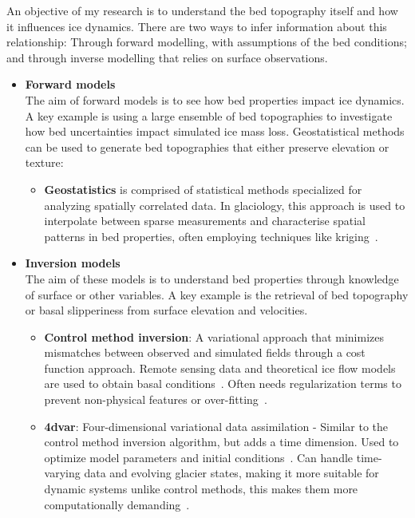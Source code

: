 An objective of my research is to understand the bed topography itself and how it influences ice dynamics. There are two ways to infer information about this relationship: Through forward modelling, with assumptions of the bed conditions; and through inverse modelling that relies on surface observations.
\begin{itemize}
    \item\textbf{Forward models}\\
    The aim of forward models is to see how bed properties impact ice dynamics. A key example is using a large ensemble of bed topographies to investigate how bed uncertainties impact simulated ice mass loss. Geostatistical methods can be used to generate bed topographies that either preserve elevation or texture:    
    \begin{itemize}
            \item\textbf{Geostatistics} is comprised of statistical methods specialized for analyzing spatially correlated data. In glaciology, this approach is used to interpolate between sparse measurements and characterise spatial patterns in bed properties, often employing techniques like kriging~\cite{Mackie_2020}.

    \end{itemize}

    \item\textbf{Inversion models}\\
    The aim of these models is to understand bed properties through knowledge of surface or other variables. A key example is the retrieval of bed topography or basal slipperiness from surface elevation and velocities.

        \begin{itemize}
            \item\textbf{Control method inversion}: A variational approach that minimizes mismatches between observed and simulated fields through a cost function approach. Remote sensing data and theoretical ice flow models are used to obtain basal conditions~\cite{deRydt_2013}. Often needs regularization terms to prevent non-physical features or over-fitting~\cite{Morlighem_Goldberg_2024}.

            \item\textbf{4dvar}: Four-dimensional variational data assimilation - Similar to the control method inversion algorithm, but adds a time dimension. Used to optimize model parameters and initial conditions~\cite{Morlighem_Goldberg_2024}. Can handle time-varying data and evolving glacier states, making it more suitable for dynamic systems unlike control methods, this makes them more computationally demanding~\cite{Morlighem_Goldberg_2024}.


\end{itemize}
\end{itemize}
